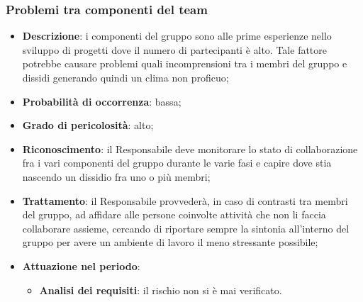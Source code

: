 		\subsubsection{Problemi tra componenti del team}
		\begin{itemize}
			\item \textbf{Descrizione}: i componenti del gruppo sono alle prime esperienze nello sviluppo di progetti dove il numero di partecipanti è alto. Tale fattore potrebbe causare problemi quali incomprensioni tra i membri del gruppo e dissidi generando quindi un 				clima non proficuo;
			\item \textbf{Probabilità di occorrenza}: bassa;
			\item \textbf{Grado di pericolosità}: alto;
			\item \textbf{Riconoscimento}: il Responsabile deve monitorare lo stato di collaborazione fra i vari componenti del gruppo durante le varie fasi e capire dove stia nascendo un dissidio fra uno o più membri;
			\item \textbf{Trattamento}: il Responsabile provvederà, in caso di contrasti tra membri del gruppo, ad affidare alle persone coinvolte attività che non li faccia collaborare assieme, cercando di riportare sempre la sintonia all'interno del gruppo per avere un 				ambiente di lavoro il meno stressante possibile;
			\item \textbf{Attuazione nel periodo}:
			\begin{itemize}
				\item \textbf{Analisi dei requisiti}: il rischio non si è mai verificato.
			\end{itemize}
		\end{itemize}
